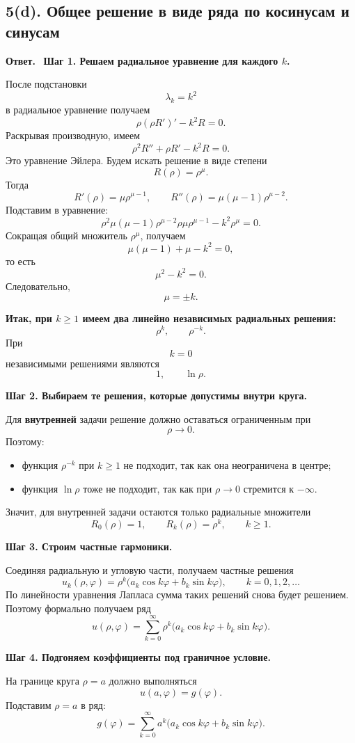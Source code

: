 \documentclass[a4paper,12pt]{article}
\newcommand{\Answer}{\textbf{Ответ.}\ }
\begin{document}
\subsection*{5(d). Общее решение в виде ряда по косинусам и синусам}

\Answer
\textbf{Шаг 1. Решаем радиальное уравнение для каждого \texorpdfstring{$k$}{k}.}

После подстановки
\[
\lambda_k=k^2
\]
в радиальное уравнение получаем
\[
\rho(\rho R')'-k^2R=0.
\]
Раскрывая производную, имеем
\[
\rho^2R''+\rho R'-k^2R=0.
\]
Это уравнение Эйлера. Будем искать решение в виде степени
\[
R(\rho)=\rho^{\mu}.
\]
Тогда
\[
R'(\rho)=\mu \rho^{\mu-1},
\qquad
R''(\rho)=\mu(\mu-1)\rho^{\mu-2}.
\]
Подставим в уравнение:
\[
\rho^2\mu(\mu-1)\rho^{\mu-2}
\rho\mu\rho^{\mu-1}
-k^2\rho^\mu=0.
\]
Сокращая общий множитель $\rho^\mu$, получаем
\[
\mu(\mu-1)+\mu-k^2=0,
\]
то есть
\[
\mu^2-k^2=0.
\]
Следовательно,
\[
\mu=\pm k.
\]

\textbf{Итак, при \texorpdfstring{$k\ge 1$}{k>=1} имеем два линейно независимых радиальных решения:}
\[
\rho^k,
\qquad
\rho^{-k}.
\]
При
\[
k=0
\]
независимыми решениями являются
\[
1,
\qquad
\ln\rho.
\]

\textbf{Шаг 2. Выбираем те решения, которые допустимы внутри круга.}

Для \textbf{внутренней} задачи решение должно оставаться ограниченным при
\[
\rho\to 0.
\]
Поэтому:
\begin{itemize}
  \item функция $\rho^{-k}$ при $k\ge 1$ не подходит, так как она неограничена в центре;
  \item функция $\ln\rho$ тоже не подходит, так как при $\rho\to 0$ стремится к $-\infty$.
\end{itemize}
Значит, для внутренней задачи остаются только радиальные множители
\[
R_0(\rho)=1,
\qquad
R_k(\rho)=\rho^k,
\qquad
k\ge 1.
\]

\textbf{Шаг 3. Строим частные гармоники.}

Соединяя радиальную и угловую части, получаем частные решения
\[
u_k(\rho,\varphi)=\rho^k\bigl(a_k\cos k\varphi+b_k\sin k\varphi\bigr),
\qquad
k=0,1,2,\dots
\]
По линейности уравнения Лапласа сумма таких решений снова будет решением. Поэтому формально получаем ряд
\[
u(\rho,\varphi)=\sum_{k=0}^{\infty}
\rho^k\bigl(a_k\cos k\varphi+b_k\sin k\varphi\bigr).
\]

\textbf{Шаг 4. Подгоняем коэффициенты под граничное условие.}

На границе круга $\rho=a$ должно выполняться
\[
u(a,\varphi)=g(\varphi).
\]
Подставим $\rho=a$ в ряд:
\[
g(\varphi)=\sum_{k=0}^{\infty}
a^k\bigl(a_k\cos k\varphi+b_k\sin k\varphi\bigr).
\]
\end{document}
